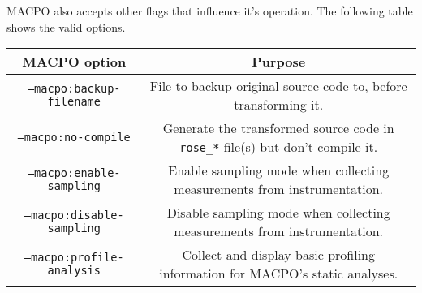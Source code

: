 MACPO also accepts other flags that influence it's operation. The following table shows the valid options.
\begin{tabular}[h]{|c|c|}\hline
\textbf{MACPO option} & \textbf{Purpose} \\\hline
\texttt{--macpo:backup-filename} & File to backup original source code to, before transforming it.\\\hline
\texttt{--macpo:no-compile} & Generate the transformed source code in \texttt{rose\_*} file(s) but don't compile it.\\\hline
\texttt{--macpo:enable-sampling} & Enable sampling mode when collecting measurements from instrumentation.\\\hline
\texttt{--macpo:disable-sampling} & Disable sampling mode when collecting measurements from instrumentation.\\\hline
\texttt{--macpo:profile-analysis} & Collect and display basic profiling information for MACPO's static analyses.\\\hline
\end{tabular}


